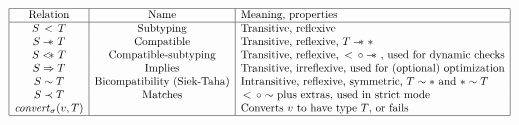 \documentclass{article}
\newcommand{\fun}[1]{\mbox{\it #1\/}}
\newcommand{\dynamic}{\t{*}}
\newcommand{\matches}[2]{#1 \prec #2}
\newcommand{\subtypeword}{\,<\,}
\newcommand{\subtype}[2]{#1 \subtypeword #2}
\newcommand{\compatible}[2]{#1 \leadsto #2}
\renewcommand{\compatible}[2]{#1 -\!\!\!*\,\, #2}
\newcommand{\comsubtype}[2]{#1 <\!\!\leadsto #2}
\renewcommand{\comsubtype}[2]{#1 <\!\!\!*\,\, #2}
\newcommand{\bicompatible}[2]{#1 \sim #2}
\newcommand{\convert}[2]{{#1}\convertword{#2}}
\newcommand{\convertword}{\mbox{\,\,$\sim :$\,\,}}
\newcommand{\implies}[2]{#1\Implies #2}
\renewcommand{\t}[1]{{\tt #1}}
\newcommand{\Implies}[0]{\Rightarrow}
\renewcommand{\convert}[2]{\fun{convert}_{\sigma}(#1,#2)}
\begin{document}
\[
\begin{array}{|c|c|l|}
\hline
\mbox{Relation} & \mbox{Name} & \mbox{Meaning, properties} \\
\hline
\subtype{S}{T} 			& \mbox{Subtyping} 			& \mbox{Transitive, reflexive}\\
\compatible{S}{T}		&\mbox{Compatible}		& \mbox{Transitive, reflexive, $\compatible{T}{\dynamic}$} \\
\comsubtype S T		&\mbox{Compatible-subtyping} & \mbox{Transitive, reflexive, $\subtype{}{}\circ\compatible{}{}$, used for dynamic checks}\\
\implies S T 			&\mbox{Implies}			&\mbox{Transitive, irreflexive, used for (optional) optimization}\\
\bicompatible S T			&\mbox{Bicompatibility (Siek-Taha)}		&\mbox{Intransitive, reflexive, symmetric, $\bicompatible T \dynamic$ and $\bicompatible \dynamic T$} \\
\matches S T			&\mbox{Matches}				&\mbox{$\subtype{}{}\circ\bicompatible{}{}$ plus extras, used in strict mode}\\
\convert v T			&\mbox{}					&\mbox{Converts $v$ to have type $T$, or fails} \\
\hline
\end{array}
\]
\end{document}
